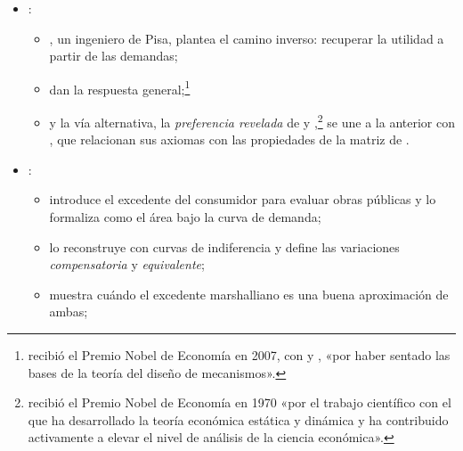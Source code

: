 \documentclass[11pt]{article}
\begin{document}
\begin{itemize}
\begin{itemize}
\begin{itemize}
\begin{itemize}
      \item \textcite{Shephard1953Cost} deriva las demandas condicionadas de factores de la función de costes;
      \item \textcite{McKenzie1957Demand} traslada el resultado al consumidor con la función de gasto, «sin índice de utilidad»;
      \item y \textcite{Uzawa1964Duality} y \textcite{Diewert1974Applications} la convierten en un método general, que hoy es la forma habitual de trabajar con la demanda.
      \end{itemize}
    \item {}:
      \begin{itemize}
      \item \textcite{Antonelli1886Teoria}, un ingeniero de Pisa, plantea el camino inverso: recuperar la utilidad a partir de las demandas;
      \item \textcite{HurwiczUzawa1971Integrability} dan la respuesta general;\footnote{ recibió el Premio Nobel de Economía en 2007, con  y , «por haber sentado las bases de la teoría del diseño de mecanismos»\nocite{Nobel2007HurwiczMaskinMyerson}.}
      \item y la vía alternativa, la \emph{preferencia revelada} de \textcite{Samuelson1938Note,Samuelson1948Consumption} y \textcite{Houthakker1950Revealed},\footnote{ recibió el Premio Nobel de Economía en 1970 «por el trabajo científico con el que ha desarrollado la teoría económica estática y dinámica y ha contribuido activamente a elevar el nivel de análisis de la ciencia económica»\nocite{Nobel1970Samuelson}.} se une a la anterior con \textcite{KihlstromMasColellSonnenschein1976}, que relacionan sus axiomas con las propiedades de la matriz de .
      \end{itemize}
    \item {}:
      \begin{itemize}
      \item \textcite{Dupuit1844Mesure} introduce el excedente del consumidor para evaluar obras públicas y \textcite{Marshall1890Principles} lo formaliza como el área bajo la curva de demanda;
      \item \textcite{Hicks1939Value,Hicks1941Rehabilitation,Hicks1943Four} lo reconstruye con curvas de indiferencia y define las variaciones \emph{compensatoria} y \emph{equivalente};
      \item \textcite{Willig1976Surplus} muestra cuándo el excedente marshalliano es una buena aproximación de ambas;

\end{itemize}
\end{itemize}
\end{itemize}
\end{itemize}
\end{document}
